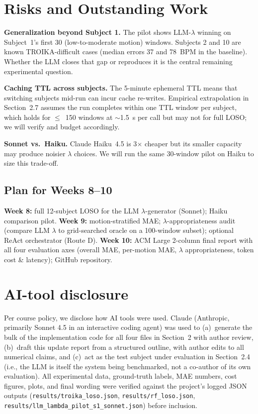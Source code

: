 \documentclass[sigconf,nonacm,balance]{acmart}
\begin{document}
\section{Risks and Outstanding Work}

\textbf{Generalization beyond Subject 1.} The pilot shows LLM-$\lambda$ winning on Subject~1's first 30 (low-to-moderate motion) windows. Subjects 2 and 10 are known TROIKA-difficult cases (median errors 37 and 78~BPM in the baseline). Whether the LLM closes that gap or reproduces it is the central remaining experimental question.

\textbf{Caching TTL across subjects.} The 5-minute ephemeral TTL means that switching subjects mid-run can incur cache re-writes. Empirical extrapolation in Section~2.7 assumes the run completes within one TTL window per subject, which holds for $\le$~150 windows at $\sim$1.5~s per call but may not for full LOSO; we will verify and budget accordingly.

\textbf{Sonnet vs.\ Haiku.} Claude Haiku~4.5 is 3$\times$ cheaper but its smaller capacity may produce noisier $\lambda$ choices. We will run the same 30-window pilot on Haiku to size this trade-off.

\subsection*{Plan for Weeks 8--10}

\noindent \textbf{Week 8:} full 12-subject LOSO for the LLM $\lambda$-generator (Sonnet); Haiku comparison pilot. \textbf{Week 9:} motion-stratified MAE; $\lambda$-appropriateness audit (compare LLM $\lambda$ to grid-searched oracle on a 100-window subset); optional ReAct orchestrator (Route D). \textbf{Week 10:} ACM Large 2-column final report with all four evaluation axes (overall MAE, per-motion MAE, $\lambda$ appropriateness, token cost \& latency); GitHub repository.

\section*{AI-tool disclosure}

Per course policy, we disclose how AI tools were used. Claude (Anthropic, primarily Sonnet 4.5 in an interactive coding agent) was used to (a)~generate the bulk of the implementation code for all four files in Section~2 with author review, (b)~draft this update report from a structured outline, with author edits to all numerical claims, and (c)~act as the test subject under evaluation in Section~2.4 (i.e., the LLM is itself the system being benchmarked, not a co-author of its own evaluation). All experimental data, ground-truth labels, MAE numbers, cost figures, plots, and final wording were verified against the project's logged JSON outputs (\texttt{results/troika\_loso.json}, \texttt{results/rf\_loso.json}, \texttt{results/llm\_lambda\_pilot\_s1\_sonnet.json}) before inclusion.
\end{document}
